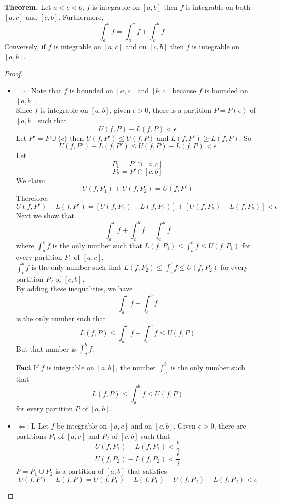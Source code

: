 \documentclass[10pt,letterpaper]{article}
\begin{document}
	\textbf{Theorem. } Let $a < c < b$, $f$ is integrable on $[a, b]$ then $f$ is integrable on both 
	$[a, c]$ and $[c, b]$. Furthermore,
	$$\displaystyle\int_{a}^{b} f = \displaystyle\int_{a}^{c} f + \displaystyle\int_{c}^{b} f$$
	Conversely, if $f$ is integrable on $[a, c]$ and on $[c, b]$ then $f$ is integrable on $[a, b]$.
	\begin{proof}
		\begin{itemize}
		\item $\Rightarrow$:
		Note that $f$ is bounded on $[a, c]$ and $[b, c]$ because $f$ is bounded on $[a, b]$. \\
		Since $f$ is integrable on $[a, b]$, given $\epsilon > 0$, there is a partition $P = P( \epsilon )$ of $[a, b]$
		such that 
		$$U(f, P) - L(f, P) < \epsilon$$
		Let $P' = P \cup \{c\}$ then $U(f, P') \leq U(f, P)$ and $L(f, P') \geq L(f, P)$. So
		$$U(f, P') - L(f, P') \leq U(f, P) - L(f, P) < \epsilon$$
		Let 
		$$P_1 = P' \cap [a, c]$$
		$$P_2 = P' \cap [c, b]$$
		We claim $$U(f, P_1) + U(f, P_2) = U(f, P')$$
		Therefore,
		$$U(f, P') - L(f, P') = [U(f, P_1) - L(f, P_1)] + [U(f, P_2) - L(f, P_2)] < \epsilon$$
		Next we show that
		$$\displaystyle\int_{a}^{c} f + \displaystyle\int_{c}^{b} f = \displaystyle\int_{a}^{b} f$$
		where
		$\displaystyle\int_{a}^{c} f$ is the only number such that $L(f, P_1) \leq \displaystyle\int_{a}^{c} f 
		\leq U(f, P_1)$ for every partition $P_1$ of $[a, c]$. \\
		$\displaystyle\int_{c}^{b} f$ is the only number such that $L(f, P_2) \leq \displaystyle\int_{c}^{b} f
		\leq U(f, P_2)$ for every partition $P_2$ of $[c, b]$. \\
		By adding these inequalities, we have
		$$\displaystyle\int_{a}^{c}f + \displaystyle\int_{c}^{b}f$$ is the only number such that
		$$L(f, P) \leq \displaystyle\int_{a}^{c}f + \displaystyle\int_{c}^{b}f \leq U(f, P)$$	
		But that number is $\displaystyle\int_{a}^{b} f$.
		
		\textbf{Fact} If $f$ is integrable on $[a, b]$, the number $\displaystyle\int_{a}^{b}$ is the only
		number such that
		$$L(f, P) \leq \displaystyle\int_{a}^{b} f \leq U(f, P)$$
		for every partition $P$ of $[a, b]$.
		
		\item $\Leftarrow$: L Let $f$ be integrable on $[a, c]$ and on $[c, b]$. Given $\epsilon > 0$,
		there are partitions $P_1$ of $[a, c]$ and $P_2$ of $[c, b]$ such that
		$$U(f, P_1) - L(f, P_1) < \dfrac{\epsilon}{2}$$
		$$U(f, P_2) - L(f, P_2) < \dfrac{\epsilon}{2}$$
		$P = P_1 \cup P_2$ is a partition of $[a, b]$ that satisfies
		$$U(f, P) - L(f, P) = U(f, P_1) - L(f, P_1) + U(f, P_2) - L(f, P_2) < \epsilon$$
		\end{itemize}
	\end{proof}
	
\end{document}
